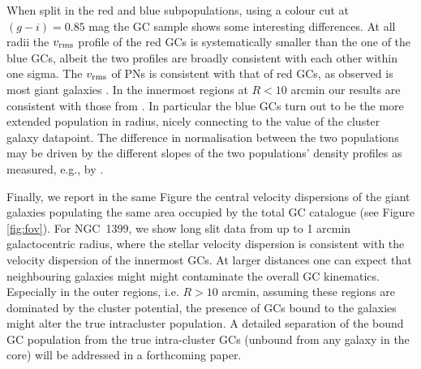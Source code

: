 \documentclass[usenatbib]{mnras}
\begin{document}
When split in the red and blue subpopulations, using a colour cut at $(g - i) = 0.85$ mag
the GC sample shows some interesting differences. At all radii the $v_{\rm rms}$
profile of the red GCs is systematically smaller than the one of the blue GCs,
albeit the two profiles are broadly consistent with each other within one sigma.
The $v_{\rm rms}$ of PNs is consistent with that of red GCs, as observed is
most giant galaxies \citep[e.g.,][]{Pota13}.
In the innermost regions at $R < 10$ arcmin our results are consistent with
those from \citet{Schuberth}. In particular the blue GCs turn out to
be the more extended population in radius, nicely connecting to the value of
the cluster galaxy datapoint. The difference in normalisation between the two
populations may be driven by the different slopes of the two
populations' density profiles as measured, e.g., by
\citet[][their Eq. 10 and 11 and Table 5]{Schuberth}.

Finally, we report in the same Figure the central velocity dispersions of
the giant galaxies populating the same area occupied by the total GC catalogue (see Figure \ref{fig:fov}).
For NGC~1399, we show long slit data from \citet{Saglia00} up
to 1 arcmin galactocentric radius, where the stellar velocity dispersion is consistent with
the velocity dispersion of the innermost GCs.
At larger distances one can expect that neighbouring galaxies might
might contaminate the overall GC kinematics. Especially in the outer regions,
i.e. $R>10$ arcmin, assuming these regions are dominated by the cluster
potential, the presence of GCs bound to the galaxies might alter the true
intracluster population. A detailed separation of the bound GC population from
the true intra-cluster GCs (unbound from any galaxy in the core) will be addressed in a
forthcoming paper.
\end{document}
